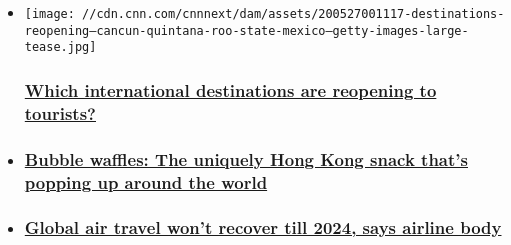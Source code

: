 \begin{itemize}
\item
  \href{/travel/article/global-destinations-reopening-to-tourists/index.html}{}

  \texttt{[image: //cdn.cnn.com/cnnnext/dam/assets/200527001117-destinations-reopening---cancun-quintana-roo-state-mexico---getty-images-large-tease.jpg]}

  \hypertarget{which-international-destinations-are-reopening-to-tourists}{%
  \subsubsection{\texorpdfstring{\href{/travel/article/global-destinations-reopening-to-tourists/index.html}{Which
  international destinations are reopening to
  tourists?}}{Which international destinations are reopening to tourists?}}\label{which-international-destinations-are-reopening-to-tourists}}
\item
  \hypertarget{bubble-waffles-the-uniquely-hong-kong-snack-thats-popping-up-around-the-world-}{%
  \subsubsection{\texorpdfstring{\href{/travel/article/hong-kong-bubble-waffles/index.html}{Bubble
  waffles: The uniquely Hong Kong snack that's popping up around the
  world
  }}{Bubble waffles: The uniquely Hong Kong snack that's popping up around the world }}\label{bubble-waffles-the-uniquely-hong-kong-snack-thats-popping-up-around-the-world-}}
\item
  \hypertarget{global-air-travel-wont-recover-till-2024-says-airline-body}{%
  \subsubsection{\texorpdfstring{\href{/travel/article/air-travel-recovery-2024/index.html}{Global
  air travel won't recover till 2024, says airline
  body}}{Global air travel won't recover till 2024, says airline body}}\label{global-air-travel-wont-recover-till-2024-says-airline-body}}
\end{itemize}

